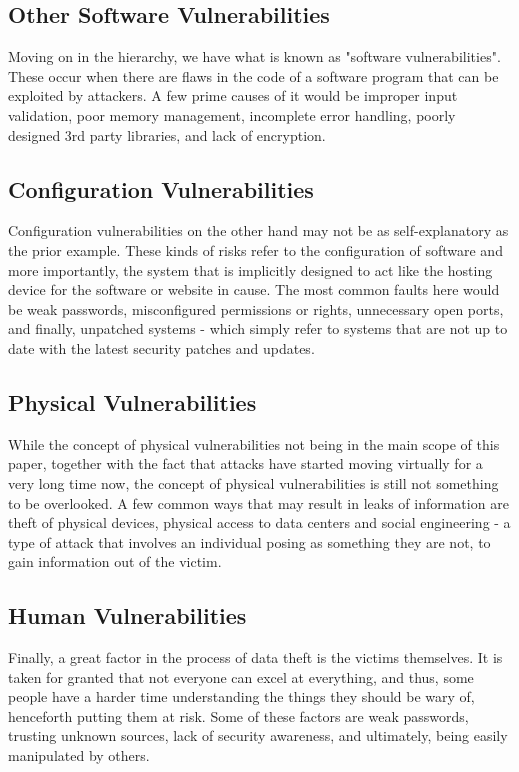 \vspace{-2px}
\subsection{Other Software Vulnerabilities}
Moving on in the hierarchy, we have what is known as "software vulnerabilities". These occur when there are flaws in the code of a software program that can be exploited by attackers. A few prime causes of it would be improper input validation, poor memory management, incomplete error handling, poorly designed 3rd party libraries, and lack of encryption.
\vspace{-2px}
\subsection{Configuration Vulnerabilities}
Configuration vulnerabilities on the other hand may not be as self-explanatory as the prior example. These kinds of risks refer to the configuration of software and more importantly, the system that is implicitly designed to act like the hosting device for the software or website in cause. The most common faults here would be weak passwords, misconfigured permissions or rights, unnecessary open ports, and finally, unpatched systems - which simply refer to systems that are not up to date with the latest security patches and updates.
\vspace{-2px}
\subsection{Physical Vulnerabilities}
While the concept of physical vulnerabilities not being in the main scope of this paper, together with the fact that attacks have started moving virtually for a very long time now, the concept of physical vulnerabilities is still not something to be overlooked. A few common ways that may result in leaks of information are theft of physical devices, physical access to data centers and social engineering - a type of attack that involves an individual posing as something they are not, to gain information out of the victim.
\vspace{-2px}
\subsection{Human Vulnerabilities}
Finally, a great factor in the process of data theft is the victims themselves. It is taken for granted that not everyone can excel at everything, and thus, some people have a harder time understanding the things they should be wary of, henceforth putting them at risk. Some of these factors are weak passwords, trusting unknown sources, lack of security awareness, and ultimately, being easily manipulated by others. 


